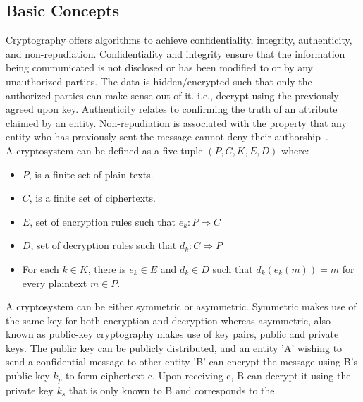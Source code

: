 \subsection{Basic Concepts}
Cryptography offers algorithms to achieve confidentiality, integrity,
authenticity, and non-repudiation. Confidentiality and integrity ensure that
the information being communicated is not disclosed or has been modified to or
by any unauthorized parties. The data is hidden/encrypted such that only the
authorized parties can make sense out of it. i.e., decrypt using the previously
agreed upon key. Authenticity relates to confirming the truth of an attribute
claimed by an entity. Non-repudiation is associated with the property that any
entity who has previously sent the message cannot deny their
authorship~\cite{katz1996handbook}. \\ 
A cryptosystem can be defined as a five-tuple $(P, C, K, E, D)$ where: 
\begin{itemize}
	\item $P$, is a finite set of plain texts.
	\item $C$, is a finite set of ciphertexts.
	\item $E$, set of encryption rules such that $e_{k}:P \Rightarrow C$
	\item $D$, set of decryption rules such that $d_{k}:C \Rightarrow P$ 
	\item For each $k \in K$, there is $e_k \in E$ and $d_k \in D$ such that $d_k(e_k(m)) = m$ for every plaintext $m \in P$.
\end{itemize}
A cryptosystem can be either symmetric or asymmetric. Symmetric makes use of
the same key for both encryption and decryption whereas asymmetric, also known
as public-key cryptography makes use of key pairs, public and private keys. The
public key can be publicly distributed, and an entity 'A' wishing to send a
confidential message to other entity 'B' can encrypt the message using B's
public key $k_{p}$ to form ciphertext c. Upon receiving c, B can decrypt it
using the private key $k_{s}$ that is only known to B and corresponds to the
